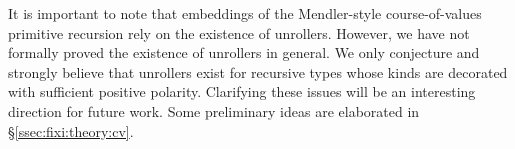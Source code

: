 It is important to note that embeddings of the Mendler-style course-of-values
primitive recursion rely on the existence of unrollers. However, we have not
formally proved the existence of unrollers in general. We only conjecture and
strongly believe that unrollers exist for recursive types whose kinds are
decorated with sufficient positive polarity. Clarifying these issues will be
an interesting direction for future work. Some preliminary ideas are
elaborated in \S\ref{ssec:fixi:theory:cv}.






